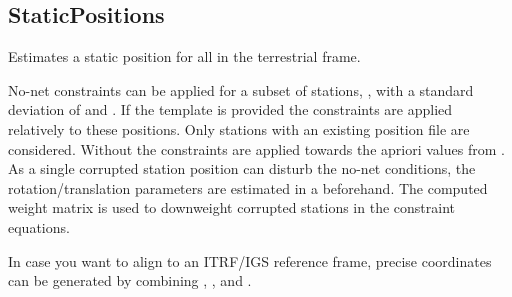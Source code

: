 \subsection{StaticPositions}\label{gnssParametrizationType:staticPositions}
Estimates a static position for all
 in the terrestrial frame.

No-net constraints can be applied for a subset of stations,
, with a
standard deviation of  and .
If the template  is provided
the constraints are applied relatively to these positions. Only stations with an existing position file
are considered. Without 
the constraints are applied towards the apriori values from
.
As a single corrupted station position can disturb the no-net conditions,
the rotation/translation parameters are estimated in a
beforehand. The computed weight matrix is used to downweight corrupted stations
in the constraint equations.

In case you want to align to an ITRF/IGS reference frame, precise coordinates can be
generated by combining , ,
and .


